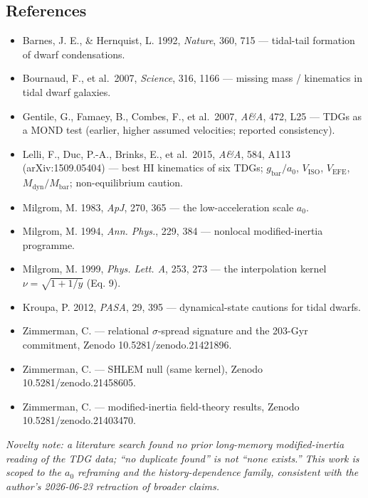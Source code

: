 \documentclass[
]{article}
\newcounter{none} %
\providecommand{\tightlist}{%
  \setlength{\itemsep}{0pt}\setlength{\parskip}{0pt}}
\begin{document}
\subsection{References}\label{references}

\begin{itemize}
\tightlist
\item
  Barnes, J. E., \& Hernquist, L. 1992, \emph{Nature}, 360, 715 ---
  tidal-tail formation of dwarf condensations.
\item
  Bournaud, F., et al.~2007, \emph{Science}, 316, 1166 --- missing mass
  / kinematics in tidal dwarf galaxies.
\item
  Gentile, G., Famaey, B., Combes, F., et al.~2007, \emph{A\&A}, 472,
  L25 --- TDGs as a MOND test (earlier, higher assumed velocities;
  reported consistency).
\item
  Lelli, F., Duc, P.-A., Brinks, E., et al.~2015, \emph{A\&A}, 584, A113
  (arXiv:1509.05404) --- best HI kinematics of six TDGs;
  \(g_\mathrm{bar}/a_0\), \(V_\mathrm{ISO}\), \(V_\mathrm{EFE}\),
  \(M_\mathrm{dyn}/M_\mathrm{bar}\); non-equilibrium caution.
\item
  Milgrom, M. 1983, \emph{ApJ}, 270, 365 --- the low-acceleration scale
  \(a_0\).
\item
  Milgrom, M. 1994, \emph{Ann. Phys.}, 229, 384 --- nonlocal
  modified-inertia programme.
\item
  Milgrom, M. 1999, \emph{Phys. Lett. A}, 253, 273 --- the interpolation
  kernel \(\nu=\sqrt{1+1/y}\) (Eq. 9).
\item
  Kroupa, P. 2012, \emph{PASA}, 29, 395 --- dynamical-state cautions for
  tidal dwarfs.
\item
  Zimmerman, C. --- relational \(\sigma\)-spread signature and the
  203-Gyr commitment, Zenodo 10.5281/zenodo.21421896.
\item
  Zimmerman, C. --- SHLEM null (same kernel), Zenodo
  10.5281/zenodo.21458605.
\item
  Zimmerman, C. --- modified-inertia field-theory results, Zenodo
  10.5281/zenodo.21403470.
\end{itemize}

\emph{Novelty note: a literature search found no prior long-memory
modified-inertia reading of the TDG data; ``no duplicate found'' is not
``none exists.'' This work is scoped to the \(a_0\) reframing and the
history-dependence family, consistent with the author's 2026-06-23
retraction of broader claims.}
\end{document}
